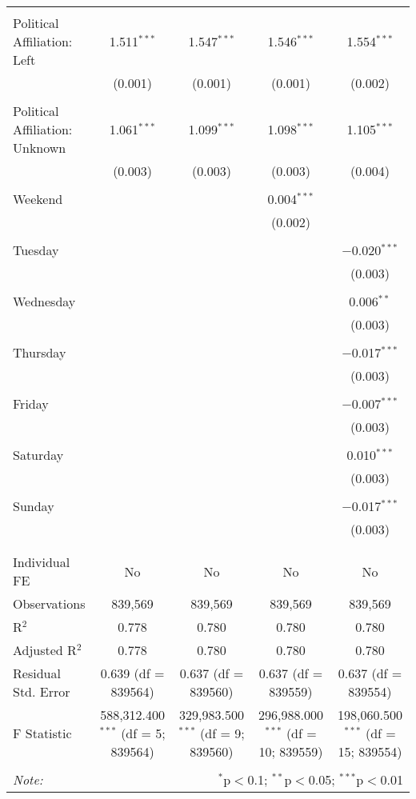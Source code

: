 \documentclass[
]{article}
\begin{document}
\begin{table}[!htbp]
{\begin{tabular}{@{\extracolsep{5pt}}lcccc}
  & & & & \\ 
 Political Affiliation: Left & 1.511$^{***}$ & 1.547$^{***}$ & 1.546$^{***}$ & 1.554$^{***}$ \\ 
  & (0.001) & (0.001) & (0.001) & (0.002) \\ 
  & & & & \\ 
 Political Affiliation: Unknown & 1.061$^{***}$ & 1.099$^{***}$ & 1.098$^{***}$ & 1.105$^{***}$ \\ 
  & (0.003) & (0.003) & (0.003) & (0.004) \\ 
  & & & & \\ 
 Weekend &  &  & 0.004$^{***}$ &  \\ 
  &  &  & (0.002) &  \\ 
  & & & & \\ 
 Tuesday &  &  &  & $-$0.020$^{***}$ \\ 
  &  &  &  & (0.003) \\ 
  & & & & \\ 
 Wednesday &  &  &  & 0.006$^{**}$ \\ 
  &  &  &  & (0.003) \\ 
  & & & & \\ 
 Thursday &  &  &  & $-$0.017$^{***}$ \\ 
  &  &  &  & (0.003) \\ 
  & & & & \\ 
 Friday &  &  &  & $-$0.007$^{***}$ \\ 
  &  &  &  & (0.003) \\ 
  & & & & \\ 
 Saturday &  &  &  & 0.010$^{***}$ \\ 
  &  &  &  & (0.003) \\ 
  & & & & \\ 
 Sunday &  &  &  & $-$0.017$^{***}$ \\ 
  &  &  &  & (0.003) \\ 
  & & & & \\ 
\hline \\[-1.8ex] 
Individual FE & No & No & No & No \\ 
Observations & 839,569 & 839,569 & 839,569 & 839,569 \\ 
R$^{2}$ & 0.778 & 0.780 & 0.780 & 0.780 \\ 
Adjusted R$^{2}$ & 0.778 & 0.780 & 0.780 & 0.780 \\ 
Residual Std. Error & 0.639 (df = 839564) & 0.637 (df = 839560) & 0.637 (df = 839559) & 0.637 (df = 839554) \\ 
F Statistic & 588,312.400$^{***}$ (df = 5; 839564) & 329,983.500$^{***}$ (df = 9; 839560) & 296,988.000$^{***}$ (df = 10; 839559) & 198,060.500$^{***}$ (df = 15; 839554) \\ 
\hline 
\hline \\[-1.8ex] 
\textit{Note:}  & \multicolumn{4}{r}{$^{*}$p$<$0.1; $^{**}$p$<$0.05; $^{***}$p$<$0.01} \\ 
\end{tabular}
} 
\end{table} 
\newpage
\end{document}
